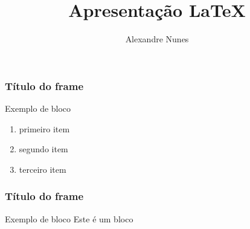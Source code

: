 \documentclass[14pt]{beamer}
\begin{document}
	\author{Alexandre Nunes}
	\title{Apresentação LaTeX}
	\begin{frame}[plain]
	\maketitle
\end{frame}


\begin{frame}
\frametitle{Título do frame}

\begin{block}{Exemplo de bloco}
	\begin{enumerate}
		\item primeiro item \pause
		\item segundo item \pause 
		\item terceiro item \pause
	\end{enumerate}
\end{block}
\end{frame}

\begin{frame}
\frametitle{Título do frame}
\transboxin
\begin{block}{Exemplo de bloco}
	Este é um bloco
\end{block}
\end{frame}

%
%
%
%
%
%
%
%
%
%
%
\end{document}
